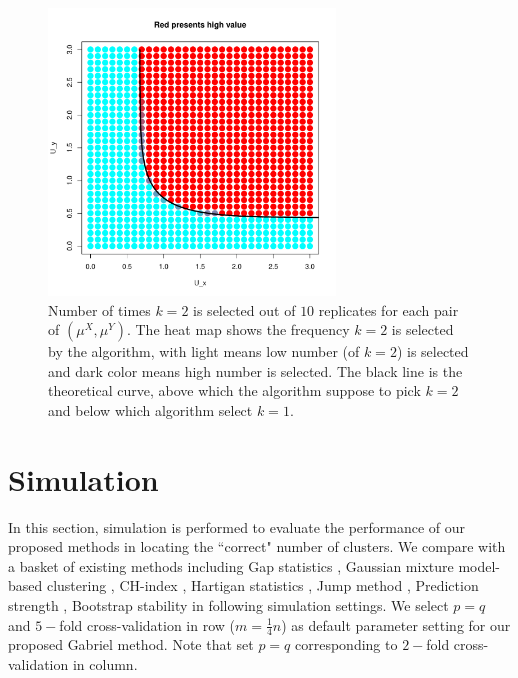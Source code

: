 \documentclass[12pt]{article}
\newcommand{\muX}{\mu^{X}}
\newcommand{\muY}{\mu^{Y}}
\begin{document}
\begin{figure}[H]
\centering
\includegraphics[width=3in]{demo/overlap/color_plot.pdf}
\caption{Number of times $k=2$ is selected out of $10$ replicates for each pair of $(\muX, \muY)$. The heat map shows the frequency $k=2$ is selected by the algorithm, with light means low number (of $k=2$) is selected and dark color means high number is selected. The black line is the theoretical curve, above which the algorithm suppose to pick $k=2$ and below which algorithm select $k=1$.  }
\label{fig:overlap-color_plot}
\end{figure}
\section{Simulation}
In this section, simulation is performed to evaluate the performance of our
proposed methods in locating the ``correct" number of clusters. We compare
with a basket of existing methods including Gap statistics
\citep{tibshirani2001estimating}, Gaussian mixture model-based clustering
\citep{fraley2002model}, CH-index \citep{calinski1974dendrite}, Hartigan
statistics \citep{hartigan1975clustering}, Jump method
\citep{sugar2003finding}, Prediction strength \citep{tibshirani2005cluster},
Bootstrap stability \citep{fang2012selection} in following simulation
settings. We select $p=q$ and $5-$fold cross-validation in row
($m=\frac{1}{4}n$) as default parameter setting for our proposed Gabriel
method. Note that set $p=q$ corresponding to $2-$fold cross-validation in
column.
\end{document}

